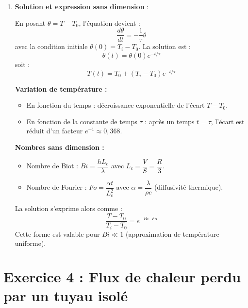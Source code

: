 \documentclass[12pt,a4paper]{article}
\begin{document}
\begin{enumerate}
    Le flux de chaleur perdu par convection s'écrit :
    \[
    \Phi = h S \left( T - T_0 \right)
    \]
    Ce flux correspond à la diminution de l'énergie interne de la bille :
    \[
    - \rho V c \frac{dT}{dt} = h S \left( T - T_0 \right)
    \]
    D'où l'équation différentielle :
    \[
    \frac{dT}{dt} + \frac{h S}{\rho V c} \left( T - T_0 \right) = 0
    \]
    On pose la constante de temps :
    \[
    \tau = \frac{\rho V c}{h S}
    \]
    Pour une sphère de rayon \(R\) : \(V = \frac{4}{3}\pi R^3\), \(S = 4\pi R^2\), donc \(\frac{V}{S} = \frac{R}{3}\) et :
    \[
    \tau = \frac{\rho c R}{3h}
    \]
    
    \item \textbf{Solution et expression sans dimension} :
    
    En posant \(\theta = T - T_0\), l'équation devient :
    \[
    \frac{d\theta}{dt} = -\frac{1}{\tau} \theta
    \]
    avec la condition initiale \(\theta(0) = T_i - T_0\). La solution est :
    \[
    \theta(t) = \theta(0) e^{-t/\tau}
    \]
    soit :
    \[
    T(t) = T_0 + \left( T_i - T_0 \right) e^{-t/\tau}
    \]
    
    \textbf{Variation de température :}
    \begin{itemize}
        \item En fonction du temps : décroissance exponentielle de l'écart \(T - T_0\).
        \item En fonction de la constante de temps \(\tau\) : après un temps \(t = \tau\), l'écart est réduit d'un facteur \(e^{-1} \approx 0,368\).
    \end{itemize}
    
    \textbf{Nombres sans dimension :}
    \begin{itemize}
        \item Nombre de Biot : \(Bi = \dfrac{h L_c}{\lambda}\) avec \(L_c = \dfrac{V}{S} = \dfrac{R}{3}\).
        \item Nombre de Fourier : \(Fo = \dfrac{\alpha t}{L_c^2}\) avec \(\alpha = \dfrac{\lambda}{\rho c}\) (diffusivité thermique).
    \end{itemize}
    
    La solution s'exprime alors comme :
    \[
    \frac{T - T_0}{T_i - T_0} = e^{-Bi \cdot Fo}
    \]
    Cette forme est valable pour \(Bi \ll 1\) (approximation de température uniforme).
\end{enumerate}

\newpage

\section*{Exercice 4 : Flux de chaleur perdu par un tuyau isolé}
\end{document}
